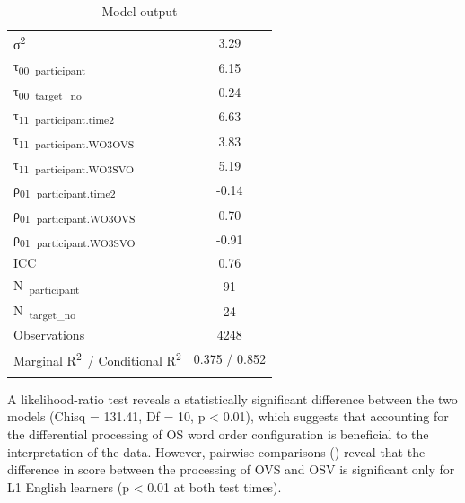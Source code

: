 \begin{table}
\begin{tabularx}{\textwidth}{Xrrr}
    σ\textsuperscript{2} & \multicolumn{3}{c}{3.29}\\
    τ\textsubscript{00}~\textsubscript{participant} & \multicolumn{3}{c}{6.15}\\
    τ\textsubscript{00}~\textsubscript{target\_no} & \multicolumn{3}{c}{0.24}\\
    τ\textsubscript{11}~\textsubscript{participant.time2} & \multicolumn{3}{c}{6.63}\\
    τ\textsubscript{11}~\textsubscript{participant.WO3OVS} & \multicolumn{3}{c}{3.83}\\
    τ\textsubscript{11}~\textsubscript{participant.WO3SVO} & \multicolumn{3}{c}{5.19}\\
    ρ\textsubscript{01}~\textsubscript{participant.time2} & \multicolumn{3}{c}{{}-0.14}\\
    ρ\textsubscript{01}~\textsubscript{participant.WO3OVS} & \multicolumn{3}{c}{0.70}\\
    ρ\textsubscript{01}~\textsubscript{participant.WO3SVO} & \multicolumn{3}{c}{{}-0.91}\\
    ICC & \multicolumn{3}{c}{0.76}\\
    N~\textsubscript{participant} & \multicolumn{3}{c}{91}\\
    N~\textsubscript{target\_no} & \multicolumn{3}{c}{24}\\
    Observations & \multicolumn{3}{c}{4248}\\
    Marginal R\textsuperscript{2}~/ Conditional R\textsuperscript{2} & \multicolumn{3}{c}{0.375 / 0.852}\\
    \lspbottomrule
    \end{tabularx}
    \caption{Model output}
    \label{tab:05:9}
\end{table}

A likelihood-ratio test reveals a statistically significant difference between the two models (Chisq = 131.41, Df = 10, p < 0.01), which suggests that accounting for the differential processing of OS word order configuration is beneficial to the interpretation of the data. However, pairwise comparisons () reveal that the difference in score between the processing of OVS and OSV is significant only for L1 English learners (p < 0.01 at both test times).

